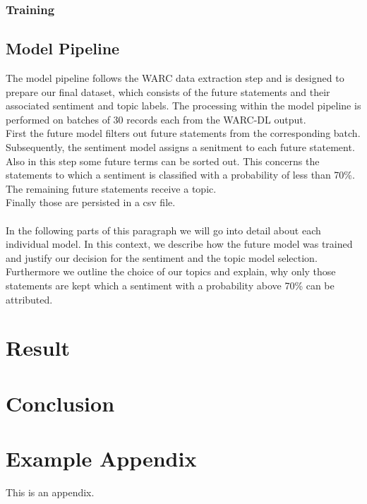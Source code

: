 \documentclass[11pt]{article}
\begin{document}
\subsubsection{Training}

\subsection{Model Pipeline}
The model pipeline follows the WARC data extraction step and is designed to prepare our final dataset, which consists of the future statements and their associated sentiment and topic labels.
The processing within the model pipeline is performed on batches of 30 records each from the WARC-DL output.\\
First the future model filters out future statements from the corresponding batch.
Subsequently, the sentiment model assigns a senitment to each future statement.
Also in this step some future terms can be sorted out. This concerns the statements to which a sentiment is classified with a probability of less than 70\%.
The remaining future statements receive a topic.\\
Finally those are  persisted in a csv file.\\\\
In the following parts of this paragraph we will go into detail about each individual model. In this context, we describe how the future model was trained and justify our decision for the sentiment and the topic model selection.
Furthermore we outline the choice of our topics and explain, why only those statements are kept which a sentiment with a probability above 70\% can be attributed.

\section{Result}

\section{Conclusion}



\appendix

\section{Example Appendix}
\label{sec:appendix}

This is an appendix.
\end{document}

